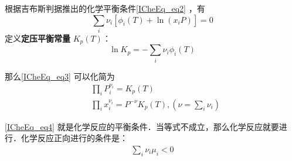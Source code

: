 根据吉布斯判据推出的化学平衡条件\autoref{ICheEq_eq2} ，有
\begin{equation}\label{ICheEq_eq3}
\sum_i\nu_i[\phi_i(T)+\ln (x_iP)]=0
\end{equation}
定义\textbf{定压平衡常量} $K_p(T)$：
\begin{equation}
\ln K_p=-\sum_i\nu_i\phi_i(T)
\end{equation}

那么\autoref{ICheEq_eq3} 可以化简为
\begin{equation}\label{ICheEq_eq4}
\begin{aligned}
&\prod_i P_i^{\nu_i}=K_p(T)\\
&\prod_i x_i^{\nu_i}=P^{-\nu} K_p(T),(\nu=\sum_i\nu_i)
\end{aligned}
\end{equation}

\autoref{ICheEq_eq4} 就是化学反应的平衡条件．当等式不成立，那么化学反应就要进行．化学反应正向进行的条件是：
\begin{equation}
\begin{aligned}
\sum_i \nu_i\mu_i<0
\end{aligned}
\end{equation}
